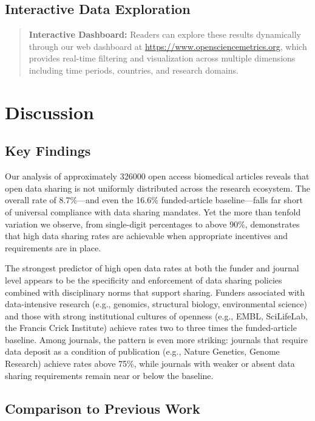 \subsection{Interactive Data Exploration}

\begin{quote}
\textbf{Interactive Dashboard:} Readers can explore these results dynamically through our web dashboard at \url{https://www.opensciencemetrics.org}, which provides real-time filtering and visualization across multiple dimensions including time periods, countries, and research domains.
\end{quote}


\section{Discussion}

\subsection{Key Findings}

Our analysis of approximately \num{326000} open access biomedical articles reveals that open data sharing is not uniformly distributed across the research ecosystem. The overall rate of 8.7\%---and even the 16.6\% funded-article baseline---falls far short of universal compliance with data sharing mandates. Yet the more than tenfold variation we observe, from single-digit percentages to above 90\%, demonstrates that high data sharing rates are achievable when appropriate incentives and requirements are in place.

The strongest predictor of high open data rates at both the funder and journal level appears to be the specificity and enforcement of data sharing policies combined with disciplinary norms that support sharing. Funders associated with data-intensive research (e.g., genomics, structural biology, environmental science) and those with strong institutional cultures of openness (e.g., EMBL, SciLifeLab, the Francis Crick Institute) achieve rates two to three times the funded-article baseline. Among journals, the pattern is even more striking: journals that require data deposit as a condition of publication (e.g., Nature Genetics, Genome Research) achieve rates above 75\%, while journals with weaker or absent data sharing requirements remain near or below the baseline.

\subsection{Comparison to Previous Work}

